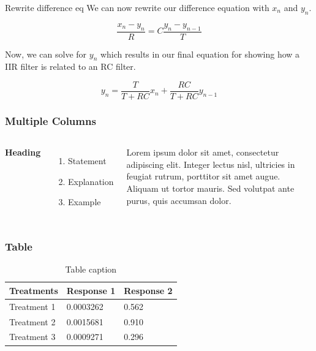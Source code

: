 \documentclass[notes]{beamer}
\begin{document}
\begin{frame}
\begin{block}{Rewrite difference eq}
We can now rewrite our difference equation with $x_n$ and $y_n$.

\begin{equation}\label{diff_xn}
\frac{x_n-y_n}{R}=C\frac{y_n-y_{n-1}}{T}
\end{equation}

Now, we can solve for $y_n$ which results in our final equation for showing how a IIR filter is related to an RC filter.

\begin{equation}\label{IIR_RC}
y_n=\frac{T}{T+RC}x_n+\frac{RC}{T+RC}y_{n-1}
\end{equation}
\end{block}
\end{frame}

%

\begin{frame}
\frametitle{Multiple Columns}
\begin{columns}[c] %

\textbf{Heading}
\begin{enumerate}
\item Statement
\item Explanation
\item Example
\end{enumerate}

Lorem ipsum dolor sit amet, consectetur adipiscing elit. Integer lectus nisl, ultricies in feugiat rutrum, porttitor sit amet augue. Aliquam ut tortor mauris. Sed volutpat ante purus, quis accumsan dolor.

\end{columns}
\end{frame}


\begin{frame}
\frametitle{Table}
\begin{table}
\begin{tabular}{l l l}
\toprule
\textbf{Treatments} & \textbf{Response 1} & \textbf{Response 2}\\
\midrule
Treatment 1 & 0.0003262 & 0.562 \\
Treatment 2 & 0.0015681 & 0.910 \\
Treatment 3 & 0.0009271 & 0.296 \\
\bottomrule
\end{tabular}
\caption{Table caption}
\end{table}
\end{frame}
\end{document}
